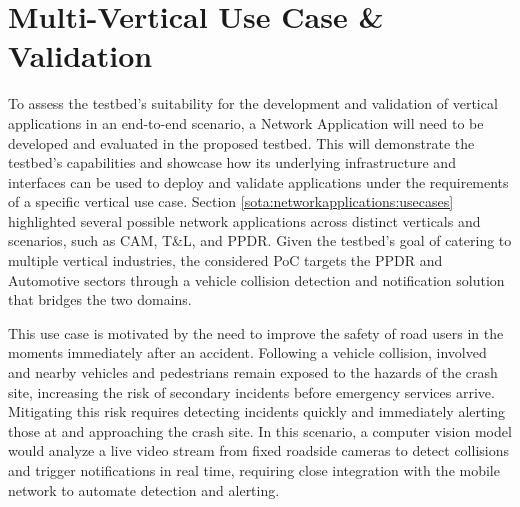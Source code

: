 \section{Multi-Vertical Use Case \& Validation}
\label{chap:proposal:use-case-validation}

To assess the testbed's suitability for the development and validation of vertical applications in an end-to-end scenario, a Network Application will need to be developed and evaluated in the proposed testbed. This will demonstrate the testbed's capabilities and showcase how its underlying infrastructure and interfaces can be used to deploy and validate applications under the requirements of a specific vertical use case. Section \ref{sota:networkapplications:usecases} highlighted several possible network applications across distinct verticals and scenarios, such as \ac{CAM}, \ac{T&L}, and \ac{PPDR}. Given the testbed's goal of catering to multiple vertical industries, the considered \ac{PoC} targets the \ac{PPDR} and Automotive sectors through a vehicle collision detection and notification solution that bridges the two domains.

This use case is motivated by the need to improve the safety of road users in the moments immediately after an accident. Following a vehicle collision, involved and nearby vehicles and pedestrians remain exposed to the hazards of the crash site, increasing the risk of secondary incidents before emergency services arrive. Mitigating this risk requires detecting incidents quickly and immediately alerting those at and approaching the crash site. In this scenario, a computer vision model would analyze a live video stream from fixed roadside cameras to detect collisions and trigger notifications in real time, requiring close integration with the mobile network to automate detection and alerting.

